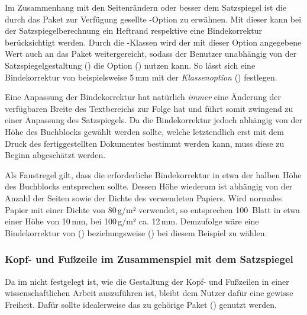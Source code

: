 \begin{DeclareEntity*}{}
\begin{DeclareEntity*}{}
\begin{DeclareEntity*}{}
Im Zusammenhang mit den Seitenrändern oder besser dem Satzspiegel ist die durch 
das Paket  zur Verfügung gesellte \KOMAScript-Option 
 zu erwähnen. Mit 
dieser kann bei der Satzspiegelberechnung ein Heftrand respektive eine 
Bindekorrektur berücksichtigt werden. Durch die \TUDScript-Klassen wird der mit 
dieser Option angegebene Wert auch an das Paket  
weitergereicht, sodass der Benutzer unabhängig von der Satzspiegelgestaltung 
() die Option () nutzen kann. 
So lässt sich eine Bindekorrektur von beispielsweise 5\,mm mit der 
\emph{Klassenoption} () festlegen.

Eine Anpassung der Bindekorrektur hat natürlich \emph{immer} eine Änderung der 
verfügbaren Breite des Textbereichs zur Folge hat und führt somit zwingend zu 
einer Anpassung des Satzspiegels. Da die Bindekorrektur jedoch abhängig von der 
Höhe des Buchblocks gewählt werden sollte, welche letztendlich erst mit dem 
Druck des fertiggestellten Dokumentes bestimmt werden kann, muss diese zu 
Beginn abgeschätzt werden.
%
\begin{Example}
Als Faustregel gilt, dass die erforderliche Bindekorrektur in etwa der halben 
Höhe des Buchblocks entsprechen sollte. Dessen Höhe wiederum ist abhängig von 
der Anzahl der Seiten sowie der Dichte des verwendeten Papiers. Wird normales 
Papier mit einer Dichte von 80\,g/m² verwendet, so entsprechen 100~Blatt in 
etwa einer Höhe von 10\,mm, bei 100\,g/m² ca. 12\,mm. Demzufolge wäre eine 
Bindekorrektur von () beziehungsweise 
() bei diesem Beispiel zu wählen.%
%
\end{Example}



\subsubsection{%
  Kopf- und Fußzeile im Zusammenspiel mit dem Satzspiegel%
}

Da im \CD nicht festgelegt ist, wie die Gestaltung der Kopf- und Fußzeilen in 
einer wissenschaftlichen Arbeit auszuführen ist, bleibt dem Nutzer dafür eine 
gewisse Freiheit. Dafür sollte idealerweise das zu \KOMAScript{} gehörige Paket 
() genutzt werden. 


\end{DeclareEntity*}
\end{DeclareEntity*}
\end{DeclareEntity*}
